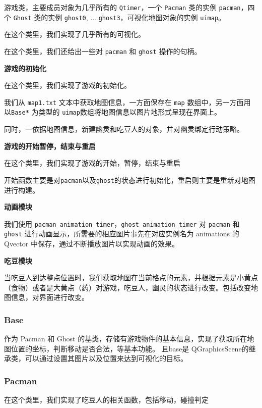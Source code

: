 \documentclass[UTF8,11pt]{ctexart}
\begin{document}
        游戏类，主要成员对象为几乎所有的 \verb|Qtimer|，一个 \verb|Pacman| 类的实例 \verb|pacman|，四个 \verb|Ghost| 类的实例 \verb|ghost0|, ... \verb|ghost3|，可视化地图对象的实例 \verb|uimap|。
	
        在这个类里，我们实现了几乎所有的可视化。
	
        在这个类里，我们还给出一些对 \verb|pacman| 和 \verb|ghost| 操作的句柄。
    
    
        \textbf{游戏的初始化}
	
        在这个类里，我们实现了游戏的初始化。
	   
        我们从 \verb|map1.txt| 文本中获取地图信息，一方面保存在 \verb|map| 数组中，另一方面用 以\verb|Base*| 为类型的 \verb|uimap|数组将地图信息以图片地形式呈现在界面上。
	
        同时，一依据地图信息，新建幽灵和吃豆人的对象，并对幽灵绑定行动策略。
        
        \textbf{游戏的开始暂停，结束与重启}
	    
        在这个类里，我们实现了游戏的开始，暂停，结束与重启
        
        开始函数主要是对\verb|pacman|以及\verb|ghost|的状态进行初始化，重启则主要是重新对地图进行构建。
        
        \textbf{动画模块}
	
        我们使用 \verb|pacman_animation_timer|，\verb|ghost_animation_timer| 对 \verb|pacman| 和 \verb|ghost| 进行动画显示，所需要的相应图片事先在对应实例名为 animations 的 Qvector 中保存，通过不断播放图片以实现动画的效果。
        
        \textbf{吃豆模块}
	    
        当吃豆人到达整点位置时，我们获取地图在当前格点的元素，并根据元素是小黄点（食物）或者是大黄点（药）对游戏，吃豆人，幽灵的状态进行改变。包括改变地图信息，对界面进行改变。

        \subsubsection{Base}

	    作为 Pacman 和 Ghost 的基类，存储有游戏物件的基本信息，实现了获取所在地图位置的坐标，判断移动是否合法，等基本功能。
        且base是 QGraphicsScene的继承类，可以通过设置其图片以及位置来达到可视化的目标。

        \subsubsection{Pacman}
	    在这个类里，我们实现了吃豆人的相关函数，包括移动，碰撞判定
        
\end{document}
